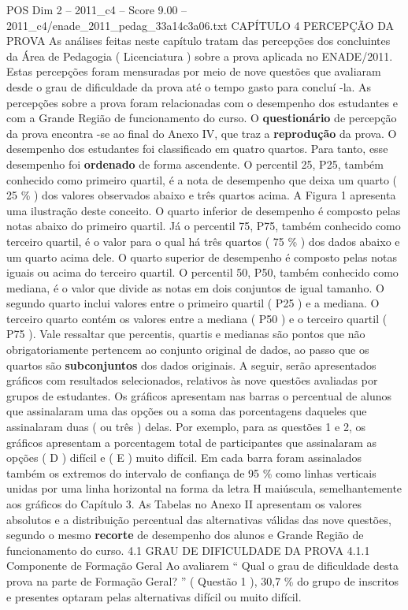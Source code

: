\begin{textsample}{POS Dim 2 – 2011\_c4 – Score 9.00 – 2011\_c4/enade\_2011\_pedag\_33a14c3a06.txt}  \label{ex:f2_pos_127}
CAPÍTULO 4 PERCEPÇÃO DA PROVA As análises feitas neste capítulo tratam das percepções dos concluintes da Área de Pedagogia ( Licenciatura ) sobre a prova aplicada no ENADE/2011.
Estas percepções foram mensuradas por meio de nove questões que avaliaram desde o grau de dificuldade da prova até o tempo gasto para concluí -la.
As percepções sobre a prova foram relacionadas com o desempenho dos estudantes e com a Grande Região de funcionamento do curso.
O \textbf{questionário} de percepção da prova encontra -se ao final do Anexo IV, que traz a \textbf{reprodução} da prova.
O desempenho dos estudantes foi classificado em quatro quartos.
Para tanto, esse desempenho foi \textbf{ordenado} de forma ascendente.
O percentil 25, P25, também conhecido como primeiro quartil, é a nota de desempenho que deixa um quarto ( 25 \% ) dos valores observados abaixo e três quartos acima.
A Figura 1 apresenta uma ilustração deste conceito.
O quarto inferior de desempenho é composto pelas notas abaixo do primeiro quartil.
Já o percentil 75, P75, também conhecido como terceiro quartil, é o valor para o qual há três quartos ( 75 \% ) dos dados abaixo e um quarto acima dele.
O quarto superior de desempenho é composto pelas notas iguais ou acima do terceiro quartil.
O percentil 50, P50, também conhecido como mediana, é o valor que divide as notas em dois conjuntos de igual tamanho.
O segundo quarto inclui valores entre o primeiro quartil ( P25 ) e a mediana.
O terceiro quarto contém os valores entre a mediana ( P50 ) e o terceiro quartil ( P75 ).
Vale ressaltar que percentis, quartis e medianas são pontos que não obrigatoriamente pertencem ao conjunto original de dados, ao passo que os quartos são \textbf{subconjuntos} dos dados originais.
A seguir, serão apresentados gráficos com resultados selecionados, relativos às nove questões avaliadas por grupos de estudantes.
Os gráficos apresentam nas barras o percentual de alunos que assinalaram uma das opções ou a soma das porcentagens daqueles que assinalaram duas ( ou três ) delas.
Por exemplo, para as questões 1 e 2, os gráficos apresentam a porcentagem total de participantes que assinalaram as opções ( D ) difícil e ( E ) muito difícil.
Em cada barra foram assinalados também os extremos do intervalo de confiança de 95 \% como linhas verticais unidas por uma linha horizontal na forma da letra H maiúscula, semelhantemente aos gráficos do Capítulo 3.
As Tabelas no Anexo II apresentam os valores absolutos e a distribuição percentual das alternativas válidas das nove questões, segundo o mesmo \textbf{recorte} de desempenho dos alunos e Grande Região de funcionamento do curso. 4.1 GRAU DE DIFICULDADE DA PROVA 4.1.1 Componente de Formação Geral Ao avaliarem “ Qual o grau de dificuldade desta prova na parte de Formação Geral? ” ( Questão 1 ), 30,7 \% do grupo de inscritos e presentes optaram pelas alternativas difícil ou muito difícil.

\end{textsample}
